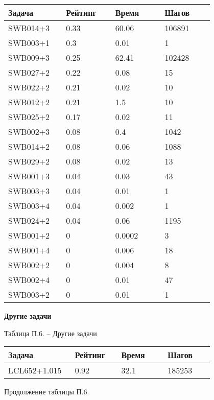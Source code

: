 \begin{longtable}[H]{|p{0.2\linewidth}|p{0.2\linewidth}|p{0.2\linewidth}|p{0.2\linewidth}|}
\hline
\textbf{Задача} & \textbf{Рейтинг} & \textbf{Время} & \textbf{Шагов} \\
\hline
SWB014+3 &  0.33 &  60.06 &  106891 \\
\hline
SWB003+1 &  0.3 &  0.01 &  1 \\
\hline
SWB009+3 &  0.25 &  62.41 &  102428 \\
\hline
SWB027+2 &  0.22 &  0.08 &  15 \\
\hline
SWB022+2 &  0.21 &  0.02 &  10 \\
\hline
SWB012+2 &  0.21 &  1.5 &  10 \\
\hline
SWB025+2 &  0.17 &  0.02 &  11 \\
\hline
SWB002+3 &  0.08 &  0.4 &  1042 \\
\hline
SWB014+2 &  0.08 &  0.06 &  1088 \\
\hline
SWB029+2 &  0.08 &  0.02 &  13 \\
\hline
SWB001+3 &  0.04 &  0.03 &  43 \\
\hline
SWB003+3 &  0.04 &  0.01 &  1 \\
\hline
SWB003+4 &  0.04 &  0.002 &  1 \\
\hline
SWB024+2 &  0.04 &  0.06 &  1195 \\
\hline
SWB001+2 &  0 &  0.0002 &  3 \\
\hline
SWB001+4 &  0 &  0.006 &  18 \\
\hline
SWB002+2 &  0 &  0.004 &  8 \\
\hline
SWB002+4 &  0 &  0.01 &  47 \\
\hline
SWB003+2 &  0 &  0.01 &  1 \\
\hline
\end{longtable}




\textbf{Другие задачи}

\begin{center}
Таблица П.6. -- Другие задачи
\end{center}

\begin{longtable}[H]{|p{0.2\linewidth}|p{0.2\linewidth}|p{0.2\linewidth}|p{0.2\linewidth}|}
\hline
\textbf{Задача} & \textbf{Рейтинг} & \textbf{Время} & \textbf{Шагов} \\
\hline
LCL652+1.015 & 0.92 & 32.1 & 185253 \\
\hline
\end{longtable}
\begin{center}
Продолжение таблицы П.6.
\end{center}

